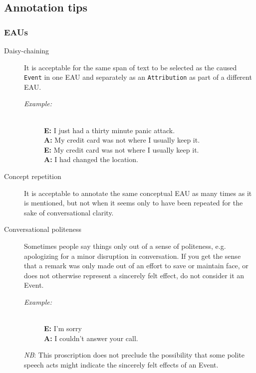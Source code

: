 \documentclass[a4paper,12pt]{article}
\begin{document}
    \subsection{Annotation tips}

    \subsubsection{EAUs}
    \begin{description}
        \item[Daisy-chaining] It is acceptable for the same span of text to be selected as the caused \texttt{Event} in one EAU and separately as an \texttt{Attribution} as part of a different EAU.
            \begin{description}
                \item[\emph{Example:}]\mbox{}\\
                \textbf{E:} I just had a thirty minute panic attack.\\ 
                \textbf{A:} My credit card was not where I usually keep it.\\
                \textbf{E:} My credit card was not where I usually keep it.\\
                \textbf{A:} I had changed the location.
            \end{description}
    \end{description}
    \begin{description}
        \item[Concept repetition] It is acceptable to annotate the same conceptual EAU as many times as it is mentioned, but not when it seems only to have been repeated for the sake of conversational clarity.
    \end{description}
    \begin{description}
        \item[Conversational politeness] Sometimes people say things only out of a sense of politeness, e.g. apologizing for a minor disruption in conversation. If you get the sense that a remark was only made out of an effort to save or maintain face, or does not otherwise represent a sincerely felt effect, do not consider it an Event.
            \begin{description}
                \item[\emph{Example:}]\mbox{}\\
                \textbf{E:} I'm sorry\\ 
                \textbf{A:} I couldn't answer your call.\\
            \end{description}
            
        \emph{NB}: This proscription does not preclude the possibility that some polite speech acts might indicate the sincerely felt effects of an Event.
    \end{description}
\end{document}
